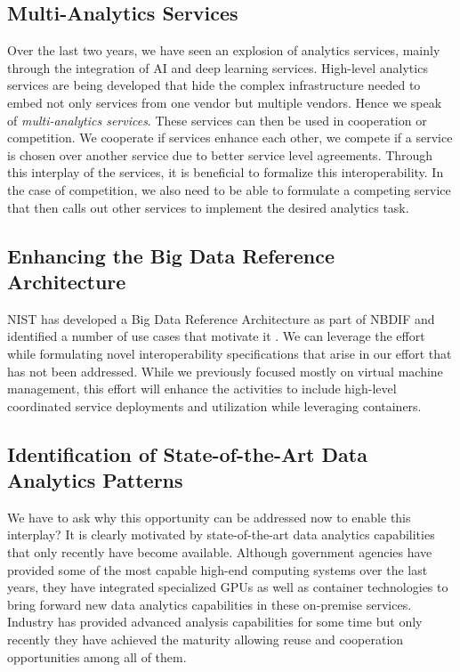 \subsection{Multi-Analytics Services}

Over the last two years, we have seen an explosion of analytics
services, mainly through the integration of AI and deep learning
services. High-level analytics services are being developed that hide the
complex infrastructure needed to embed not only services from one
vendor but multiple vendors. Hence we speak of {\em multi-analytics
  services}. These services can then be used in cooperation or
competition. We cooperate if services enhance each other, we compete
if a service is chosen over another service due to better service
level agreements. Through this interplay of the services, it is
beneficial to formalize this interoperability. In the case of competition,
we also need to be able to formulate a competing service that then
calls out other services to implement the desired analytics task.

\subsection{Enhancing the Big Data Reference Architecture}
\label{s:arch}

NIST has developed a Big Data Reference Architecture as part of
NBDIF\cite{nist-v6} and identified a number of use cases that motivate
it \cite{nist-v3}. We can leverage the effort
~\cite{nist-v1,nist-v2,nist-v3,nist-v4,nist-v5,nist-v6,nist-v7,nist-v8,nist-v9}
while formulating novel interoperability specifications that arise in
our effort that has not been addressed. While we previously focused
mostly on virtual machine management, this effort will enhance the
activities to include high-level coordinated service deployments and
utilization while leveraging containers.

\subsection{Identification of State-of-the-Art Data Analytics Patterns}

We have to ask why this opportunity can be addressed now to enable
this interplay?  It is clearly motivated by state-of-the-art data
analytics capabilities that only recently have become available.
Although government agencies have provided some of the most capable
high-end computing systems over the last years, they have integrated
specialized GPUs as well as container technologies to bring forward
new data analytics capabilities in these on-premise services. Industry
has provided advanced analysis capabilities for some time but only
recently they have achieved the maturity allowing reuse and
cooperation opportunities among all of them.

